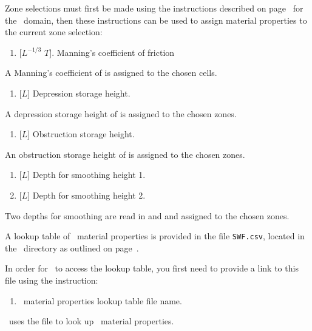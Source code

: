Zone selections must first be made using the instructions described on page~\pageref{page:zoneSelect} for the \gwf\ domain, then these instructions can be used to assign material properties to the current zone selection:

    {
        \squish
        \begin{enumerate}
        \item {} [$L^{-1/3}$  $T$].  Manning's coefficient of friction
        \end{enumerate}
          A Manning's coefficient of  is assigned to the chosen cells.
    }

    {
        \squish
        \begin{enumerate}
        \item {} [$L$]  Depression storage height.
        \end{enumerate}
          A depression storage height of  is assigned to the chosen zones.
    }

    {
        \squish
        \begin{enumerate}
        \item {} [$L$]  Obstruction storage height.
        \end{enumerate}
          An obstruction storage height of  is assigned to the chosen zones.
    }

    {
        \squish
        \begin{enumerate}
        \item {} [$L$]  Depth for smoothing height 1.
        \item {} [$L$]  Depth for smoothing height 2.
        \end{enumerate}
          Two depths for smoothing are read in  and  and assigned to the chosen zones.
    }

A lookup table of \swf\ material properties  is provided in the file \texttt{SWF.csv}, located in the \bin\ directory as outlined on page~\pageref{page:userbin}.

In order for \mut\ to access the lookup table, you first need to provide a link to this file using the instruction:

    {
        \squish
        \begin{enumerate}
        \item {}  \swf\ material properties lookup table file name.
        \end{enumerate}
          \mut\ uses the file  to look up \swf\ material properties.
    }

